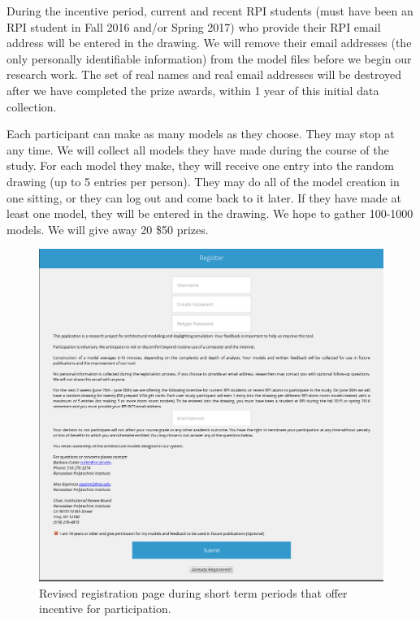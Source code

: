 \documentclass[12pt]{article}
\begin{document}
During the incentive period, current and recent RPI students (must
have been an RPI student in Fall 2016 and/or Spring 2017) who provide
their RPI email address will be entered in the drawing.  We will
remove their email addresses (the only personally identifiable
information) from the model files before we begin our research work.
The set of real names and real email addresses will be destroyed after
we have completed the prize awards, within 1 year of this initial data
collection.


Each participant can make as many models as they choose.  They may
stop at any time.  We will collect all models they have made during
the course of the study.  For each model they make, they will receive
one entry into the random drawing (up to 5 entries per person).  They
may do all of the model creation in one sitting, or they can log out
and come back to it later.  If they have made at least one model, they
will be entered in the drawing.  We hope to gather 100-1000 models.
We will give away 20 \$50 prizes.






\begin{figure}[h]
    \centering
    \includegraphics[scale=0.4]{incentive_register_prompt}
\caption{Revised registration page during short term periods that offer incentive for participation.}
\label{fig:registration_incentive}
\end{figure}
\end{document}
